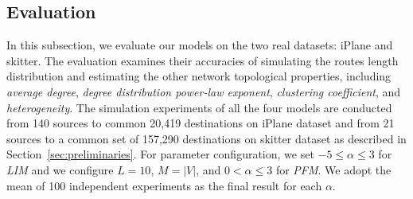 \documentclass[a4paper]{llncs}
\begin{document}
\subsection{Evaluation}
In this subsection, we evaluate our models on the two real datasets: iPlane and skitter. The evaluation examines their accuracies of simulating the routes length distribution and estimating the other network topological properties, including {\it average degree}, {\it degree distribution power-law exponent}, {\it clustering coefficient}, and {\it heterogeneity}. The simulation experiments of all the four models are conducted from 140 sources to common 20,419 destinations on iPlane dataset and from 21 sources to a common set of 157,290 destinations on skitter dataset as described in Section~\ref{sec:preliminaries}. For parameter configuration, we set $-5 \le \alpha \le 3$ for \textit{LIM} and we configure $L=10$, $M=|V|$, and $0 <
\alpha \le3$ for \textit{PFM}. We adopt the mean of 100
independent experiments as the final result for each $\alpha$.
\begin{comment}
\begin{figure*}[!t]
\centering
\subfigure[iPlane]{
\label{figure5:subfig:a}
\texttt{[image: figure/figure5a.eps]}
}
\subfigure[skitter]{
\label{figure5:subfig:b}
\texttt{[image: figure/figure5b.eps]}
}
\vspace{-1.7em}
\caption{The average routes length of the real traces and the four models on two real datasets: iPlane and skitter, respectively.}
\label{figure5}
\vspace{-0.5em}
\end{figure*}
\begin{figure*}[!t]
\centering
\subfigure[iPlane]{
\label{figure6:subfig:a}
\texttt{[image: figure/figure6a.eps]}
}
\subfigure[skitter]{
\label{figure6:subfig:b}
\texttt{[image: figure/figure6b.eps]}
}
\vspace{-1.7em}
\caption{The Kullback-Leibler divergence of the routes length distribution between the real traces and the four models on two real datasets: iPlane and skitter, respectively.}
\label{figure6}
\vspace{-0.5em}
\end{figure*}
\end{comment}
\end{document}
